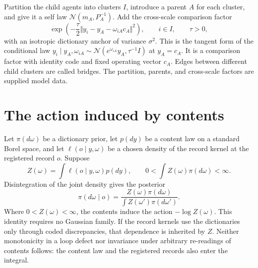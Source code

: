 \documentclass[11pt,letterpaper]{report}
\begin{document}
Partition the child agents into clusters $I$, introduce a parent $A$ for each cluster, and give it a self law $\mathcal N(m_A,P_A^{-1})$. Add the cross-scale comparison factor
\begin{equation}
\exp\left(-\frac{\tau}{2}\Vert y_i-y_A-\omega_{iA}c_A\Vert^2\right),
\qquad i\in I,\qquad \tau>0,
\label{it3:top-down}
\end{equation}
with an isotropic dictionary anchor of variance $\sigma^2$. This is the tangent form of the conditional law $y_i\mid y_A,\omega_{iA}\sim\mathcal N(e^{\omega_{iA}}y_A,\tau^{-1}I)$ at $y_A=c_A$. It is a comparison factor with identity code and fixed operating vector $c_A$. Edges between different child clusters are called bridges. The partition, parents, and cross-scale factors are supplied model data.

\chapter{The action induced by contents}
\label{it3:ch-induced}

Let $\pi(d\omega)$ be a dictionary prior, let $p(dy)$ be a content law on a standard Borel space, and let $\ell(o\mid y,\omega)$ be a chosen density of the record kernel at the registered record $o$. Suppose
\begin{equation}
Z(\omega)=\int\ell(o\mid y,\omega)p(dy),\qquad
0<\int Z(\omega)\pi(d\omega)<\infty.
\end{equation}
Disintegration of the joint density gives the posterior
\begin{equation}
\pi(d\omega\mid o)
=\frac{Z(\omega)\pi(d\omega)}{\int Z(\omega')\pi(d\omega')}.
\end{equation}
Where $0<Z(\omega)<\infty$, the contents induce the action $-\log Z(\omega)$. This identity requires no Gaussian family. If the record kernels use the dictionaries only through coded discrepancies, that dependence is inherited by $Z$. Neither monotonicity in a loop defect nor invariance under arbitrary re-readings of contents follows: the content law and the registered records also enter the integral.
\end{document}
